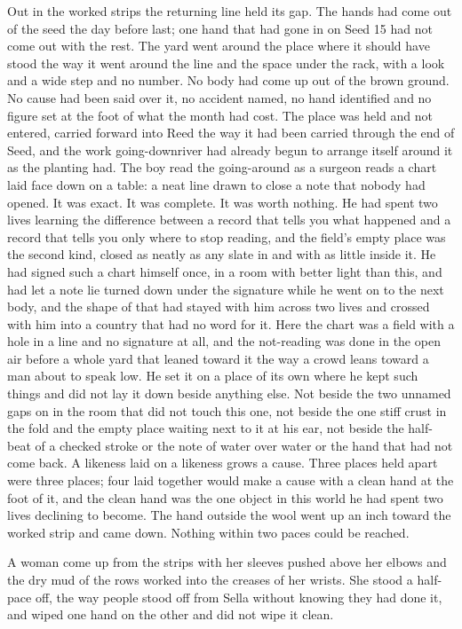 Out in the worked strips the returning line held its gap. The hands had come out of the seed the day before last; one hand that had gone in on Seed 15 had not come out with the rest. The yard went around the place where it should have stood the way it went around the line and the space under the rack, with a look and a wide step and no number. No body had come up out of the brown ground. No cause had been said over it, no accident named, no hand identified and no figure set at the foot of what the month had cost. The place was held and not entered, carried forward into Reed the way it had been carried through the end of Seed, and the work going-downriver had already begun to arrange itself around it as the planting had. The boy read the going-around as a surgeon reads a chart laid face down on a table: a neat line drawn to close a note that nobody had opened. It was exact. It was complete. It was worth nothing. He had spent two lives learning the difference between a record that tells you what happened and a record that tells you only where to stop reading, and the field's empty place was the second kind, closed as neatly as any slate in  and with as little inside it. He had signed such a chart himself once, in a room with better light than this, and had let a note lie turned down under the signature while he went on to the next body, and the shape of that had stayed with him across two lives and crossed with him into a country that had no word for it. Here the chart was a field with a hole in a line and no signature at all, and the not-reading was done in the open air before a whole yard that leaned toward it the way a crowd leans toward a man about to speak low. He set it on a place of its own where he kept such things and did not lay it down beside anything else. Not beside the two unnamed gaps on  in the room that did not touch this one, not beside the one stiff crust in the fold and the empty place waiting next to it at his ear, not beside the half-beat of a checked stroke or the note of water over water or the hand that had not come back. A likeness laid on a likeness grows a cause. Three places held apart were three places; four laid together would make a cause with a clean hand at the foot of it, and the clean hand was the one object in this world he had spent two lives declining to become. The hand outside the wool went up an inch toward the worked strip and came down. Nothing within two paces could be reached.

\scenebreak

A woman come up from the strips with her sleeves pushed above her elbows and the dry mud of the rows worked into the creases of her wrists. She stood a half-pace off, the way people stood off from Sella without knowing they had done it, and wiped one hand on the other and did not wipe it clean.

